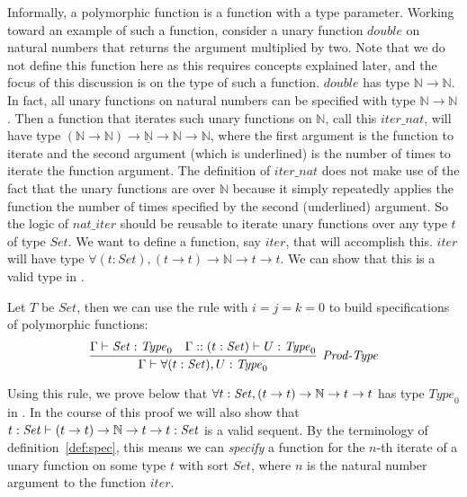Informally, a polymorphic function is a function with a type parameter. Working toward an example of such a function, consider a unary function $\mathit{double}$ on natural numbers that returns the argument multiplied by two. Note that we do not define this function here as this requires concepts explained later, and the focus of this discussion is on the type of such a function. $\mathit{double}$ has type $\mathbb{N} \rightarrow \mathbb{N}$. In fact, all unary functions on natural numbers can be specified with type $\mathbb{N} \rightarrow \mathbb{N}$. Then a function that iterates such unary functions on $\mathbb{N}$, call this $\mathit{iter\_nat}$, will have type $(\mathbb{N} \rightarrow \mathbb{N}) \rightarrow \underline{\mathbb{N}} \rightarrow \mathbb{N} \rightarrow \mathbb{N}$, where the first argument is the function to iterate and the second argument (which is underlined) is the number of times to iterate the function argument. The definition of $\mathit{iter\_nat}$ does not make use of the fact that the unary functions are over $\mathbb{N}$ because it simply repeatedly applies the function the number of times specified by the second (underlined) argument. So the logic of $\mathit{nat\_iter}$ should be reusable to iterate unary functions over any type $t$ of type $\mathit{Set}$. We want to define a function, say $\mathit{iter}$, that will accomplish this. $\mathit{iter}$ will have type $\forall (t : \mathit{Set}), (t \rightarrow t) \rightarrow \mathbb{N} \rightarrow t \rightarrow t$. We can show that this is a valid type in \coc{}.


Let $T$ be $\mathit{Set}$, then we can use the  rule with $i=j=k=0$ to build specifications of polymorphic functions: \\

$$
\infer[\rl{Prod-Type}]{\seq{\forall (t : \mathit{Set}), U : \mathit{Type}_0}}{\seq{\mathit{Set} : \mathit{Type}_0} & \seq[\Gamma :: (t : \mathit{Set})]{U : \mathit{Type}_0}}
$$

\bigskip

Using this rule, we prove below that $\forall t : \mathit{Set}, (t \rightarrow t) \rightarrow \mathbb{N}{} \rightarrow t \rightarrow t$ has type $\mathit{Type}_0$ in \coc{}. In the course of this proof we will also show that $t : \mathit{Set} \vdash (t \rightarrow t) \rightarrow \mathbb{N}{} \rightarrow t \rightarrow t : \mathit{Set}$ is a valid sequent. By the terminology of definition~\ref{def:spec}, this means we can \emph{specify} a function for the $n$-th iterate of a unary function on some type $t$ with sort $\mathit{Set}$, where $n$ is the natural number argument to the function $\mathit{iter}$.

